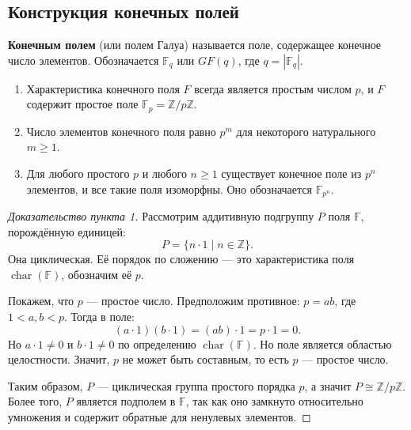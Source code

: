 \documentclass[10pt]{article}
\begin{document}
\subsection{Конструкция конечных полей}

\begin{definition}
\textbf{Конечным полем} (или полем Галуа) называется поле, содержащее конечное число элементов. Обозначается $\mathbb{F}_q$ или $GF(q)$, где $q = |\mathbb{F}_q|$.
\end{definition}

\begin{theorem}
\begin{enumerate}
    \item Характеристика конечного поля $F$ всегда является простым числом $p$, и $F$ содержит простое поле $\mathbb{F}_p = \mathbb{Z}/p\mathbb{Z}$.
    \item Число элементов конечного поля равно $p^m$ для некоторого натурального $m \ge 1$.
    \item Для любого простого $p$ и любого $n \ge 1$ существует конечное поле из $p^n$ элементов, и все такие поля изоморфны. Оно обозначается $\mathbb{F}_{p^n}$.
\end{enumerate}
\end{theorem}

\begin{proof}[Доказательство пункта 1]
Рассмотрим аддитивную подгруппу $P$ поля $\mathbb{F}$, порождённую единицей:
\[
P = \{ n \cdot 1 \mid n \in \mathbb{Z} \}.
\]
Она циклическая. Её порядок по сложению — это характеристика поля $\operatorname{char}(\mathbb{F})$, обозначим её $p$.

Покажем, что $p$ — простое число. Предположим противное: $p = ab$, где $1 < a, b < p$. Тогда в поле:
\[
(a \cdot 1)(b \cdot 1) = (ab) \cdot 1 = p \cdot 1 = 0.
\]
Но $a \cdot 1 \neq 0$ и $b \cdot 1 \neq 0$ по определению $\operatorname{char}(\mathbb{F})$. Но поле является областью целостности. Значит, $p$ не может быть составным, то есть $p$ — простое число.

Таким образом, $P$ — циклическая группа простого порядка $p$, а значит $P \cong \mathbb{Z}/p\mathbb{Z}$. Более того, $P$ является подполем в $\mathbb{F}$, так как оно замкнуто относительно умножения и содержит обратные для ненулевых элементов.
\end{proof}
\end{document}
